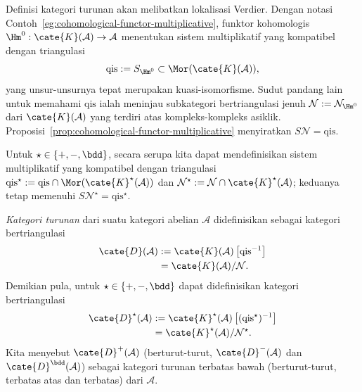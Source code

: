 Definisi kategori turunan akan melibatkan lokalisasi Verdier. Dengan notasi
Contoh~\ref{eg:cohomological-functor-multiplicative}, funktor kohomologis
$\Hm^0: \cate{K}(\mathcal{A}) \to \mathcal{A}$ menentukan sistem
multiplikatif yang kompatibel dengan triangulasi
\[ \mathrm{qis} := S_{\Hm^0} \subset \Mor(\cate{K}(\mathcal{A})), \]
	yang unsur-unsurnya tepat merupakan kuasi-isomorfisme. Sudut pandang lain
untuk memahami $\mathrm{qis}$ ialah meninjau subkategori bertriangulasi jenuh
$\mathcal{N} := \mathcal{N}_{\Hm^0}$ dari $\cate{K}(\mathcal{A})$ yang terdiri
atas kompleks-kompleks asiklik. Proposisi~\ref{prop:cohomological-functor-multiplicative}
menyiratkan $S\mathcal{N} = \mathrm{qis}$.

Untuk $\star \in \{+, -, \bdd\}$, secara serupa kita dapat mendefinisikan
sistem multiplikatif yang kompatibel dengan triangulasi
$\mathrm{qis}^\star := \mathrm{qis} \cap \Mor(\cate{K}^\star(\mathcal{A}))$
dan $\mathcal{N}^\star := \mathcal{N} \cap \cate{K}^\star(\mathcal{A})$;
keduanya tetap memenuhi
$S\mathcal{N}^\star = \mathrm{qis}^\star$.

\begin{definisi}\label{def:derived-cat}
	\emph{Kategori turunan} dari suatu kategori abelian $\mathcal{A}$
	didefinisikan sebagai kategori bertriangulasi
	\begin{align*}
		\cate{D}(\mathcal{A}) & := \cate{K}(\mathcal{A})\left[ \mathrm{qis}^{-1} \right] \\
		& = \cate{K}(\mathcal{A})/\mathcal{N}.
	\end{align*}
	Demikian pula, untuk $\star \in \{+, -, \bdd\}$ dapat didefinisikan kategori
	bertriangulasi
	\begin{align*}
		\cate{D}^\star(\mathcal{A}) & := \cate{K}^\star(\mathcal{A})\left[ (\mathrm{qis}^\star)^{-1} \right] \\
		& = \cate{K}^\star(\mathcal{A})/\mathcal{N}^\star .
	\end{align*}
	Kita menyebut $\cate{D}^+(\mathcal{A})$ (berturut-turut,
	$\cate{D}^-(\mathcal{A})$ dan $\cate{D}^\bdd(\mathcal{A})$) sebagai
	kategori turunan terbatas bawah (berturut-turut, terbatas atas dan terbatas)
	dari $\mathcal{A}$.
\end{definisi}

